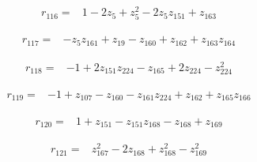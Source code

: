 \par\noindent\begin{minipage}{\linewidth}
\begin{align*}
r_{116}={}&1-2z_{5}+z_{5}^{2}-2z_{5}z_{151}+z_{163}
\end{align*}
\end{minipage}\par
\par\noindent\begin{minipage}{\linewidth}
\begin{align*}
r_{117}={}&-z_{5}z_{161}+z_{19}-z_{160}+z_{162}+z_{163}z_{164}
\end{align*}
\end{minipage}\par
\par\noindent\begin{minipage}{\linewidth}
\begin{align*}
r_{118}={}&-1+2z_{151}z_{224}-z_{165}+2z_{224}-z_{224}^{2}
\end{align*}
\end{minipage}\par
\par\noindent\begin{minipage}{\linewidth}
\begin{align*}
r_{119}={}&-1+z_{107}-z_{160}-z_{161}z_{224}+z_{162}+z_{165}z_{166}
\end{align*}
\end{minipage}\par
\par\noindent\begin{minipage}{\linewidth}
\begin{align*}
r_{120}={}&1+z_{151}-z_{151}z_{168}-z_{168}+z_{169}
\end{align*}
\end{minipage}\par
\par\noindent\begin{minipage}{\linewidth}
\begin{align*}
r_{121}={}&z_{167}^{2}-2z_{168}+z_{168}^{2}-z_{169}^{2}
\end{align*}
\end{minipage}\par
